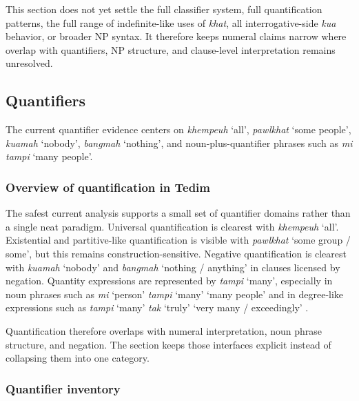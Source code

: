 \documentclass[
  11pt,
  a4paper,
]{article}
\newcommand{\tdim}[1]{\textit{#1}}
\newcommand{\glossquote}[1]{`#1'}
\begin{document}
This section does not yet settle the full classifier system, full
quantification patterns, the full range of indefinite-like uses of
\tdim{khat}, all interrogative-side \tdim{kua} behavior, or broader NP
syntax. It therefore keeps numeral claims narrow where overlap with
quantifiers, NP structure, and clause-level interpretation remains
unresolved.

\subsection{Quantifiers}\label{quantifiers}

The current quantifier evidence centers on \tdim{khempeuh}
\glossquote{all}, \tdim{pawlkhat} \glossquote{some people},
\tdim{kuamah} \glossquote{nobody}, \tdim{bangmah} \glossquote{nothing},
and noun-plus-quantifier phrases such as \tdim{mi tampi}
\glossquote{many people}.

\subsubsection{Overview of quantification in
Tedim}\label{overview-of-quantification-in-tedim}

The safest current analysis supports a small set of quantifier domains
rather than a single neat paradigm. Universal quantification is clearest
with \tdim{khempeuh} \glossquote{all}. Existential and partitive-like
quantification is visible with \tdim{pawlkhat}
\glossquote{some group / some}, but this remains construction-sensitive.
Negative quantification is clearest with \tdim{kuamah}
\glossquote{nobody} and \tdim{bangmah} \glossquote{nothing / anything}
in clauses licensed by negation. Quantity expressions are represented by
\tdim{tampi} \glossquote{many}, especially in noun phrases such as
\tdim{mi} \glossquote{person} \tdim{tampi} \glossquote{many}
\glossquote{many people} and in degree-like expressions such as
\tdim{tampi} \glossquote{many} \tdim{tak} \glossquote{truly}
\glossquote{very many / exceedingly}
\citep{henderson1965, zamngaihcing2017}.

Quantification therefore overlaps with numeral interpretation, noun
phrase structure, and negation. The section keeps those interfaces
explicit instead of collapsing them into one category.

\subsubsection{Quantifier inventory}\label{quantifier-inventory}
\end{document}
